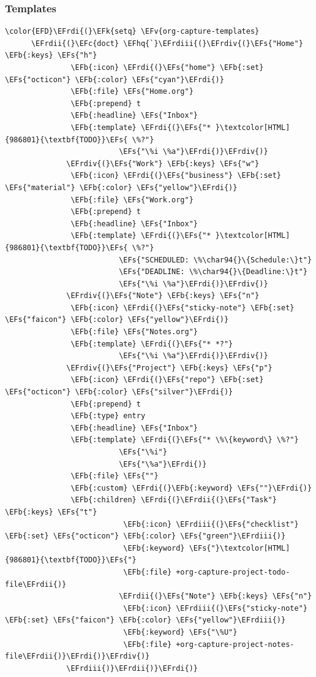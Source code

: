 \documentclass{scrartcl}
\newcommand{\EFk}[1]{\textcolor{EFk}{#1}} %
\newcommand{\EFs}[1]{\textcolor{EFs}{#1}} %
\newcommand{\EFb}[1]{\textcolor{EFb}{#1}} %
\newcommand{\EFc}[1]{\textcolor{EFc}{#1}} %
\newcommand{\EFv}[1]{\textcolor{EFv}{#1}} %
\newcommand{\EFhq}[1]{\textcolor{EFhq}{#1}} %
\newcommand{\EFrdi}[1]{\textcolor{EFrdi}{#1}} %
\newcommand{\EFrdii}[1]{\textcolor{EFrdii}{#1}} %
\newcommand{\EFrdiii}[1]{\textcolor{EFrdiii}{#1}} %
\newcommand{\EFrdiv}[1]{\textcolor{EFrdiv}{#1}} %
\begin{document}
\subsubsection{Templates}
\label{sec:org0d4561c}
\begin{Code}
\begin{Verbatim}[]
\color{EFD}\EFrdi{(}\EFk{setq} \EFv{org-capture-templates}
      \EFrdii{(}\EFc{doct} \EFhq{`}\EFrdiii{(}\EFrdiv{(}\EFs{"Home"} \EFb{:keys} \EFs{"h"}
               \EFb{:icon} \EFrdi{(}\EFs{"home"} \EFb{:set} \EFs{"octicon"} \EFb{:color} \EFs{"cyan"}\EFrdi{)}
               \EFb{:file} \EFs{"Home.org"}
               \EFb{:prepend} t
               \EFb{:headline} \EFs{"Inbox"}
               \EFb{:template} \EFrdi{(}\EFs{"* }\textcolor[HTML]{986801}{\textbf{TODO}}\EFs{ \%?"}
                          \EFs{"\%i \%a"}\EFrdi{)}\EFrdiv{)}
              \EFrdiv{(}\EFs{"Work"} \EFb{:keys} \EFs{"w"}
               \EFb{:icon} \EFrdi{(}\EFs{"business"} \EFb{:set} \EFs{"material"} \EFb{:color} \EFs{"yellow"}\EFrdi{)}
               \EFb{:file} \EFs{"Work.org"}
               \EFb{:prepend} t
               \EFb{:headline} \EFs{"Inbox"}
               \EFb{:template} \EFrdi{(}\EFs{"* }\textcolor[HTML]{986801}{\textbf{TODO}}\EFs{ \%?"}
                          \EFs{"SCHEDULED: \%\char94{}\{Schedule:\}t"}
                          \EFs{"DEADLINE: \%\char94{}\{Deadline:\}t"}
                          \EFs{"\%i \%a"}\EFrdi{)}\EFrdiv{)}
              \EFrdiv{(}\EFs{"Note"} \EFb{:keys} \EFs{"n"}
               \EFb{:icon} \EFrdi{(}\EFs{"sticky-note"} \EFb{:set} \EFs{"faicon"} \EFb{:color} \EFs{"yellow"}\EFrdi{)}
               \EFb{:file} \EFs{"Notes.org"}
               \EFb{:template} \EFrdi{(}\EFs{"* *?"}
                          \EFs{"\%i \%a"}\EFrdi{)}\EFrdiv{)}
              \EFrdiv{(}\EFs{"Project"} \EFb{:keys} \EFs{"p"}
               \EFb{:icon} \EFrdi{(}\EFs{"repo"} \EFb{:set} \EFs{"octicon"} \EFb{:color} \EFs{"silver"}\EFrdi{)}
               \EFb{:prepend} t
               \EFb{:type} entry
               \EFb{:headline} \EFs{"Inbox"}
               \EFb{:template} \EFrdi{(}\EFs{"* \%\{keyword\} \%?"}
                          \EFs{"\%i"}
                          \EFs{"\%a"}\EFrdi{)}
               \EFb{:file} \EFs{""}
               \EFb{:custom} \EFrdi{(}\EFb{:keyword} \EFs{""}\EFrdi{)}
               \EFb{:children} \EFrdi{(}\EFrdii{(}\EFs{"Task"} \EFb{:keys} \EFs{"t"}
                           \EFb{:icon} \EFrdiii{(}\EFs{"checklist"} \EFb{:set} \EFs{"octicon"} \EFb{:color} \EFs{"green"}\EFrdiii{)}
                           \EFb{:keyword} \EFs{"}\textcolor[HTML]{986801}{\textbf{TODO}}\EFs{"}
                           \EFb{:file} +org-capture-project-todo-file\EFrdii{)}
                          \EFrdii{(}\EFs{"Note"} \EFb{:keys} \EFs{"n"}
                           \EFb{:icon} \EFrdiii{(}\EFs{"sticky-note"} \EFb{:set} \EFs{"faicon"} \EFb{:color} \EFs{"yellow"}\EFrdiii{)}
                           \EFb{:keyword} \EFs{"\%U"}
                           \EFb{:file} +org-capture-project-notes-file\EFrdii{)}\EFrdi{)}\EFrdiv{)}
              \EFrdiii{)}\EFrdii{)}\EFrdi{)}
\end{Verbatim}
\end{Code}
\end{document}
